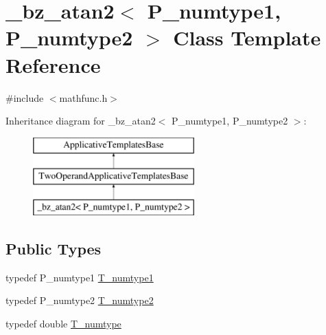 \hypertarget{class__bz__atan2}{}\section{\+\_\+bz\+\_\+atan2$<$ P\+\_\+numtype1, P\+\_\+numtype2 $>$ Class Template Reference}
\label{class__bz__atan2}


{\ttfamily \#include $<$mathfunc.\+h$>$}

Inheritance diagram for \+\_\+bz\+\_\+atan2$<$ P\+\_\+numtype1, P\+\_\+numtype2 $>$\+:\begin{figure}[H]
\begin{center}
\leavevmode
\includegraphics[height=3.000000cm]{class__bz__atan2}
\end{center}
\end{figure}
\subsection*{Public Types}
\begin{DoxyCompactItemize}
\item 
typedef P\+\_\+numtype1 \hyperlink{class__bz__atan2_a9e08366af14c7f1fbc8d55a49f2bb2da}{T\+\_\+numtype1}
\item 
typedef P\+\_\+numtype2 \hyperlink{class__bz__atan2_a40f7175c4a62b37f7c826c5d16517880}{T\+\_\+numtype2}
\item 
typedef double \hyperlink{class__bz__atan2_a90e64330361e1c19af37a2156dcb95f8}{T\+\_\+numtype}
\end{DoxyCompactItemize}
